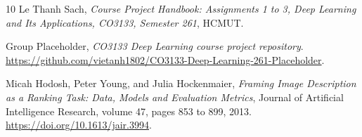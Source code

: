 {}
\begin{thebibliography}{10}
Le Thanh Sach, \emph{Course Project Handbook: Assignments 1 to 3, Deep Learning
and Its Applications, CO3133, Semester 261}, HCMUT.

Group Placeholder, \emph{CO3133 Deep Learning course project repository}.
\url{https://github.com/vietanh1802/CO3133-Deep-Learning-261-Placeholder}.

Micah Hodosh, Peter Young, and Julia Hockenmaier,
\emph{Framing Image Description as a Ranking Task: Data, Models and Evaluation
Metrics}, Journal of Artificial Intelligence Research, volume 47, pages 853 to
899, 2013.
\url{https://doi.org/10.1613/jair.3994}.


\end{thebibliography}

